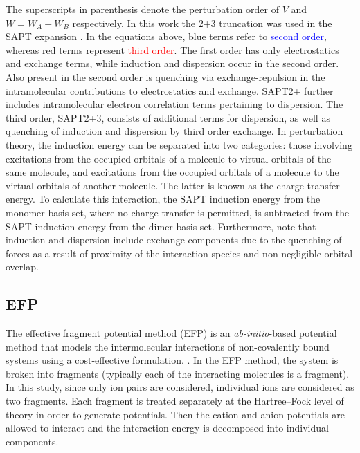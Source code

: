 The superscripts in parenthesis denote the perturbation order of $V$ and $W = W_A + W_B$ respectively. 
In this work the 2+3 truncation was used in the SAPT expansion
\cite{Turney2012a}.
In the equations above, blue terms refer to \textcolor{blue}{second order}, whereas red terms represent \textcolor{red}{third order}.
The first order has only electrostatics and exchange terms, while induction and dispersion occur in the second order.
Also present in the second order is quenching via exchange-repulsion in the intramolecular contributions to electrostatics and exchange.
SAPT2+ further includes intramolecular electron correlation terms pertaining to dispersion.
The third order, SAPT2+3, consists of additional terms for dispersion, as well as quenching of induction and dispersion by third order exchange.
In perturbation theory, the induction energy can be separated into two categories: those involving excitations from the occupied orbitals of a molecule to virtual orbitals of the same molecule, and excitations from the occupied orbitals of a molecule to the virtual orbitals of another molecule.
\cite{Stone2009a}
The latter is known as the charge-transfer energy.
To calculate this interaction, the SAPT induction energy from the monomer basis set, where no charge-transfer is permitted, is subtracted from the SAPT induction energy from the dimer basis set.
Furthermore, note that induction and dispersion include exchange components due to the quenching of forces as a result of proximity of the interaction species and non-negligible orbital overlap.
\cite{Jeziorski1994a, Hohenstein2010a, Hohenstein2010b, Hohenstein2010c, Hohenstein2011a, Hohenstein2012a}



\subsection{EFP}
The effective fragment potential method (EFP) is an \emph{ab-initio}-based potential method that models the intermolecular interactions of non-covalently bound systems using a cost-effective formulation.
\cite{Gordon2001a, Gordon2007a, Gordon2009a, Mullin2009a, Ghosh2010a}.
In the EFP method, the system is broken into fragments (typically each of the interacting molecules is a fragment). 
In this study, since only ion pairs are considered, individual ions are considered as two fragments. 
Each fragment is treated separately at the Hartree--Fock level of theory in order to generate potentials.
Then the cation and anion potentials are allowed to interact and the interaction energy is decomposed into individual components.


